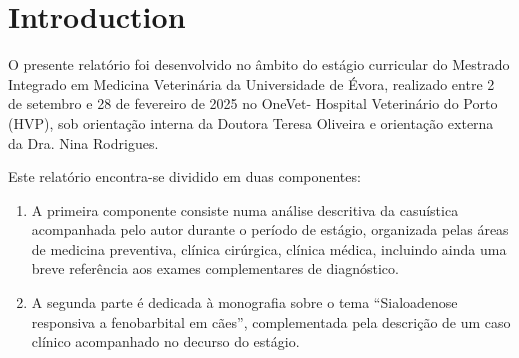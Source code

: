 
\chapter{Introduction}
\label{chapter:introduction}

O presente relatório foi desenvolvido no âmbito do estágio curricular do Mestrado Integrado em Medicina Veterinária da Universidade de Évora, realizado entre 2 de setembro e 28 de fevereiro de 2025 no OneVet- Hospital Veterinário do Porto (HVP), sob orientação interna da Doutora Teresa Oliveira e orientação externa da Dra. Nina Rodrigues.

Este relatório encontra-se dividido em duas componentes:
\begin{enumerate}
    \item A primeira componente consiste numa análise descritiva da casuística acompanhada pelo autor durante o período de estágio, organizada pelas áreas de medicina preventiva, clínica cirúrgica, clínica médica, incluindo ainda uma breve referência aos exames complementares de diagnóstico.
    \item A segunda parte é dedicada à monografia sobre o tema “Sialoadenose responsiva a fenobarbital em cães”, complementada pela descrição de um caso clínico acompanhado no decurso do estágio.
\end{enumerate}






